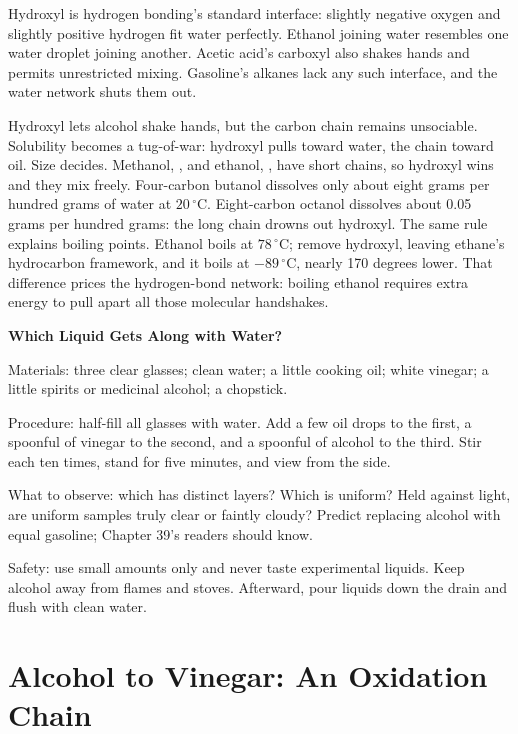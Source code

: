Hydroxyl is hydrogen bonding's standard interface: slightly negative oxygen and slightly positive hydrogen fit water perfectly. Ethanol joining water resembles one water droplet joining another. Acetic acid's carboxyl also shakes hands and permits unrestricted mixing. Gasoline's alkanes lack any such interface, and the water network shuts them out.

\begin{qiaoliang}
Hydroxyl lets alcohol shake hands, but the carbon chain remains unsociable. Solubility becomes a tug-of-war: hydroxyl pulls toward water, the chain toward oil. Size decides. Methanol, , and ethanol, , have short chains, so hydroxyl wins and they mix freely. Four-carbon butanol dissolves only about eight grams per hundred grams of water at $20\,^{\circ}\mathrm{C}$. Eight-carbon octanol dissolves about 0.05 grams per hundred grams: the long chain drowns out hydroxyl. The same rule explains boiling points. Ethanol boils at $78\,^{\circ}\mathrm{C}$; remove hydroxyl, leaving ethane's hydrocarbon framework, and it boils at $-89\,^{\circ}\mathrm{C}$, nearly 170 degrees lower. That difference prices the hydrogen-bond network: boiling ethanol requires extra energy to pull apart all those molecular handshakes.
\end{qiaoliang}

\begin{shiyan}
\textbf{Which Liquid Gets Along with Water?}

Materials: three clear glasses; clean water; a little cooking oil; white vinegar; a little spirits or medicinal alcohol; a chopstick.

Procedure: half-fill all glasses with water. Add a few oil drops to the first, a spoonful of vinegar to the second, and a spoonful of alcohol to the third. Stir each ten times, stand for five minutes, and view from the side.

What to observe: which has distinct layers? Which is uniform? Held against light, are uniform samples truly clear or faintly cloudy? Predict replacing alcohol with equal gasoline; Chapter 39's readers should know.

Safety: use small amounts only and never taste experimental liquids. Keep alcohol away from flames and stoves. Afterward, pour liquids down the drain and flush with clean water.
\end{shiyan}

\section{Alcohol to Vinegar: An Oxidation Chain}

